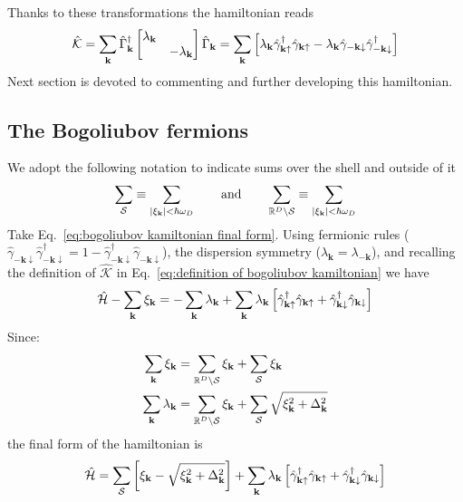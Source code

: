 Thanks to these transformations the hamiltonian reads
\begin{equation}\label{eq:bogoliubov kamiltonian final form}
	\hat{\mathcal{K}} = \sum_\mathbf{k} \hat{\Gamma}_\mathbf{k}^\dagger \begin{bmatrix}
		\lambda_\mathbf{k} & \\
		& -\lambda_\mathbf{k}
	\end{bmatrix} \hat{\Gamma}_\mathbf{k} =
	\sum_\mathbf{k} \left[{\lambda_\mathbf{k} \hat{\gamma}_{\mathbf{k}\uparrow}^\dagger \hat{\gamma}_{\mathbf{k}\uparrow} - \lambda_\mathbf{k} \hat{\gamma}_{-\mathbf{k}\downarrow}\hat{\gamma}_{-\mathbf{k}\downarrow}^\dagger}\right]
\end{equation}
Next section is devoted to commenting and further developing this hamiltonian.

\subsection{The Bogoliubov fermions}\label{subsec:the bogoliubov fermions}

We adopt the following notation to indicate sums over the shell and outside of it
\[
	\sum_\mathcal{S} \equiv \sum_{\abs{\xi_\mathbf{k}} < \hbar\omega_D}
	\quad\qq{and}\quad
	\sum_{\R^D\setminus\mathcal{S}} \equiv \sum_{\abs{\xi_\mathbf{k}} < \hbar\omega_D}
\]
Take Eq.~\eqref{eq:bogoliubov kamiltonian final form}. Using fermionic rules ($\hat{\gamma}_{-\mathbf{k}\downarrow}\hat{\gamma}_{-\mathbf{k}\downarrow}^\dagger = 1 - \hat{\gamma}_{-\mathbf{k}\downarrow}^\dagger\hat{\gamma}_{-\mathbf{k}\downarrow}$), the dispersion symmetry ($\lambda_\mathbf{k} = \lambda_{-\mathbf{k}}$), and recalling the definition of $\hat{\mathcal{K}}$ in Eq.~\eqref{eq:definition of bogoliubov kamiltonian} we have
\[
	\hat{\mathcal{H}} - \sum_\mathbf{k} \xi_\mathbf{k}  = -\sum_\mathbf{k} \lambda_\mathbf{k} + \sum_\mathbf{k} \lambda_\mathbf{k} \left[{ \hat{\gamma}_{\mathbf{k}\uparrow}^\dagger \hat{\gamma}_{\mathbf{k}\uparrow} + \hat{\gamma}_{\mathbf{k}\downarrow}^\dagger\hat{\gamma}_{\mathbf{k}\downarrow}}\right]
\]
Since:
\[
\begin{aligned}
	\sum_\mathbf{k} \xi_\mathbf{k} &= \sum_{\mathbb{R}^D\setminus\mathcal{S}} \xi_\mathbf{k} + \sum_\mathcal{S} \xi_\mathbf{k} \\
	\sum_\mathbf{k} \lambda_\mathbf{k} &= \sum_{\mathbb{R}^D\setminus\mathcal{S}} \xi_\mathbf{k} + \sum_\mathcal{S} \sqrt{\xi_\mathbf{k}^2 + \Delta_\mathbf{k}^2}
\end{aligned}
\]
the final form of the hamiltonian is
\[
	\hat{\mathcal{H}} = \sum_\mathcal{S} \left[{\xi_\mathbf{k} - \sqrt{\xi_\mathbf{k}^2 + \Delta_\mathbf{k}^2}}\right] + \sum_\mathbf{k} \lambda_\mathbf{k} \left[{ \hat{\gamma}_{\mathbf{k}\uparrow}^\dagger \hat{\gamma}_{\mathbf{k}\uparrow} + \hat{\gamma}_{\mathbf{k}\downarrow}^\dagger\hat{\gamma}_{\mathbf{k}\downarrow}}\right]
\]


